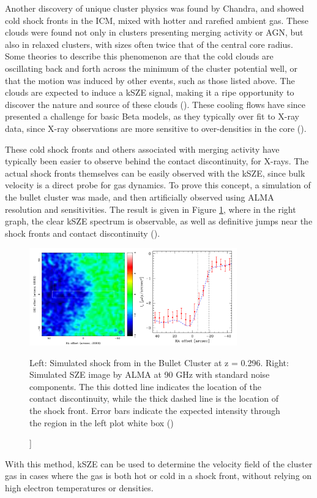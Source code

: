 \documentclass[manuscript]{aastex}
\begin{document}
Another discovery of unique cluster physics was found by Chandra, and showed cold shock fronts in the ICM, mixed with hotter and rarefied ambient gas. These clouds were found not only in clusters presenting merging activity or AGN, but also in relaxed clusters, with sizes often twice that of the central core radius. Some theories to describe this phenomenon are that the cold clouds are oscillating back and forth across the minimum of the cluster potential well, or that the motion was induced by other events, such as those listed above. The clouds are expected to induce a kSZE signal, making it a ripe opportunity to discover the nature and source of these clouds (\cite{Diego2003}). These cooling flows have since presented a challenge for basic Beta models, as they typically over fit to X-ray data, since X-ray observations are more sensitive to over-densities in the core (\cite{Benson2003}). 

These cold shock fronts and others associated with merging activity have typically been easier to observe behind the contact discontinuity, for X-rays. The actual shock fronts themselves can be easily observed with the kSZE, since bulk velocity is a direct probe for gas dynamics. To prove this concept, a simulation of the bullet cluster was made, and then artificially observed using ALMA resolution and sensitivities. The result is given in Figure \ref{fig:bulletcluster}, where in the right graph, the clear kSZE spectrum is observable, as well as definitive jumps near the shock fronts and contact discontinuity (\cite{Kitayama2014}). 

\begin{figure}[H]
\centering
\captionsetup{width=0.8\textwidth}
\includegraphics[width=0.8\textwidth]{bulletcluster.png}
\caption[ Bullet Cluster Simulated Shock Front kSZE Detection -[\cite{Kitayama2014}]]{Left: Simulated shock from in the Bullet Cluster at z = 0.296. Right: Simulated SZE image by ALMA at 90 GHz with standard noise components. The this dotted line indicates the location of the contact discontinuity, while the thick dashed line is the location of the shock front. Error bars indicate the expected intensity through the region in the left plot white box (\cite{Kitayama2014})}
\label{fig:bulletcluster}
\end{figure}
With this method, kSZE can be used to determine the velocity field of the cluster gas in cases where the gas is both hot or cold in a shock front, without relying on high electron temperatures or densities. 
\end{document}

